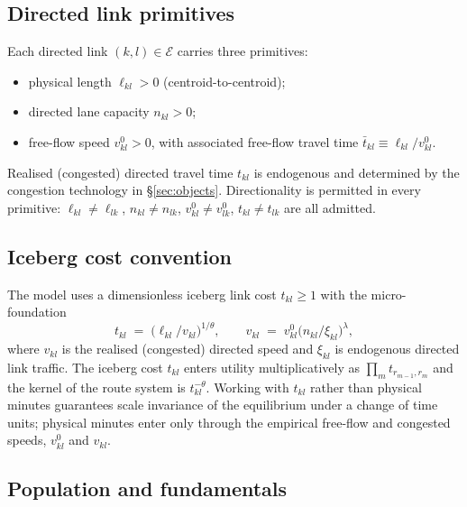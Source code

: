 \documentclass[12pt]{article}
\newcommand{\E}{\mathcal E}
\newcommand{\tbar}{\bar t}
\newcommand{\tkl}{t_{kl}}
\begin{document}
\subsection{Directed link primitives}

Each directed link $(k,l)\in\E$ carries three primitives:
\begin{itemize}[leftmargin=2em,itemsep=0.2em]
  \item physical length $\ell_{kl}>0$ (centroid-to-centroid);
  \item directed lane capacity $n_{kl}>0$;
  \item free-flow speed $v^{0}_{kl}>0$, with associated free-flow
        travel time $\tbar_{kl}\equiv\ell_{kl}/v^{0}_{kl}$.
\end{itemize}
Realised (congested) directed travel time $\tkl$ is endogenous and
determined by the congestion technology in
\S\ref{sec:objects}.  Directionality is permitted in every primitive:
$\ell_{kl}\ne\ell_{lk}$, $n_{kl}\ne n_{lk}$, $v^{0}_{kl}\ne v^{0}_{lk}$,
$\tkl\ne t_{lk}$ are all admitted.

\subsection{Iceberg cost convention}\label{ssec:iceberg}

The model uses a dimensionless iceberg link cost $\tkl\ge 1$ with the
\citet{AllenArkolakis2022} micro-foundation
\begin{equation}
  \tkl\;=\;\bigl(\ell_{kl}/v_{kl}\bigr)^{1/\theta},
  \qquad
  v_{kl}\;=\;v^{0}_{kl}\bigl(n_{kl}/\xi_{kl}\bigr)^{\lambda},
  \label{eq:iceberg}
\end{equation}
where $v_{kl}$ is the realised (congested) directed speed and
$\xi_{kl}$ is endogenous directed link traffic.  The iceberg cost
$\tkl$ enters utility multiplicatively as
$\prod_m t_{r_{m-1},r_m}$ and the kernel of the route system is
$\tkl^{-\theta}$.  Working with $\tkl$ rather than physical minutes
guarantees scale invariance of the equilibrium under a change of time
units; physical minutes enter only through the empirical free-flow
and congested speeds, $v^{0}_{kl}$ and $v_{kl}$.

\subsection{Population and fundamentals}
\end{document}
